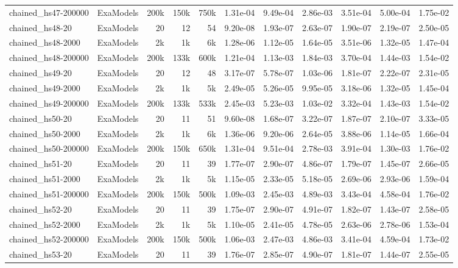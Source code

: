 {\begin{longtable}{@{}ll rrr rrr rr r@{}}
  chained\_hs47-200000 & ExaModels & 200k & 150k & 750k & 1.31e-04 & 9.49e-04 & 2.86e-03 & 3.51e-04 & 5.00e-04 & 1.75e-02 \\
  chained\_hs48-20 & ExaModels & 20 & 12 & 54 & 9.20e-08 & 1.93e-07 & 2.63e-07 & 1.90e-07 & 2.19e-07 & 2.50e-05 \\
  chained\_hs48-2000 & ExaModels & 2k & 1k & 6k & 1.28e-06 & 1.12e-05 & 1.64e-05 & 3.51e-06 & 1.32e-05 & 1.47e-04 \\
  chained\_hs48-200000 & ExaModels & 200k & 133k & 600k & 1.21e-04 & 1.13e-03 & 1.84e-03 & 3.70e-04 & 1.44e-03 & 1.54e-02 \\
  chained\_hs49-20 & ExaModels & 20 & 12 & 48 & 3.17e-07 & 5.78e-07 & 1.03e-06 & 1.81e-07 & 2.22e-07 & 2.31e-05 \\
  chained\_hs49-2000 & ExaModels & 2k & 1k & 5k & 2.49e-05 & 5.26e-05 & 9.95e-05 & 3.18e-06 & 1.32e-05 & 1.45e-04 \\
  chained\_hs49-200000 & ExaModels & 200k & 133k & 533k & 2.45e-03 & 5.23e-03 & 1.03e-02 & 3.32e-04 & 1.43e-03 & 1.54e-02 \\
  chained\_hs50-20 & ExaModels & 20 & 11 & 51 & 9.60e-08 & 1.68e-07 & 3.22e-07 & 1.87e-07 & 2.10e-07 & 3.33e-05 \\
  chained\_hs50-2000 & ExaModels & 2k & 1k & 6k & 1.36e-06 & 9.20e-06 & 2.64e-05 & 3.88e-06 & 1.14e-05 & 1.66e-04 \\
  chained\_hs50-200000 & ExaModels & 200k & 150k & 650k & 1.31e-04 & 9.51e-04 & 2.78e-03 & 3.91e-04 & 1.30e-03 & 1.76e-02 \\
  chained\_hs51-20 & ExaModels & 20 & 11 & 39 & 1.77e-07 & 2.90e-07 & 4.86e-07 & 1.79e-07 & 1.45e-07 & 2.66e-05 \\
  chained\_hs51-2000 & ExaModels & 2k & 1k & 5k & 1.15e-05 & 2.33e-05 & 5.18e-05 & 2.69e-06 & 2.93e-06 & 1.59e-04 \\
  chained\_hs51-200000 & ExaModels & 200k & 150k & 500k & 1.09e-03 & 2.45e-03 & 4.89e-03 & 3.43e-04 & 4.58e-04 & 1.76e-02 \\
  chained\_hs52-20 & ExaModels & 20 & 11 & 39 & 1.75e-07 & 2.90e-07 & 4.91e-07 & 1.82e-07 & 1.43e-07 & 2.58e-05 \\
  chained\_hs52-2000 & ExaModels & 2k & 1k & 5k & 1.10e-05 & 2.41e-05 & 4.78e-05 & 2.63e-06 & 2.78e-06 & 1.53e-04 \\
  chained\_hs52-200000 & ExaModels & 200k & 150k & 500k & 1.06e-03 & 2.47e-03 & 4.86e-03 & 3.41e-04 & 4.59e-04 & 1.73e-02 \\
  chained\_hs53-20 & ExaModels & 20 & 11 & 39 & 1.76e-07 & 2.85e-07 & 4.90e-07 & 1.81e-07 & 1.44e-07 & 2.55e-05 \\

\end{longtable}}
